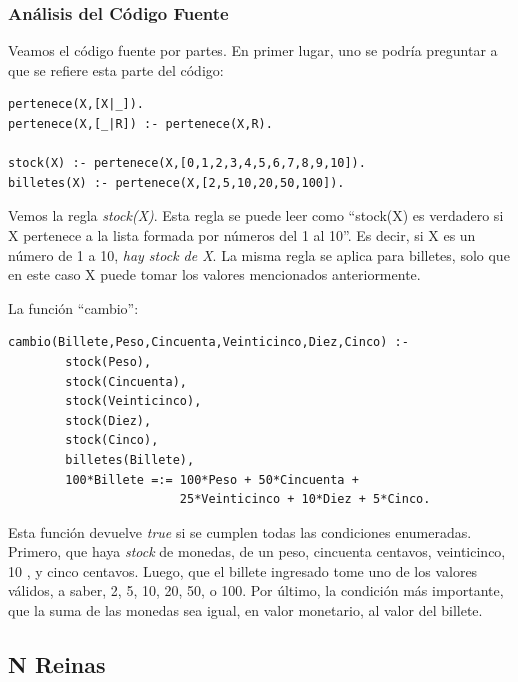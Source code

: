 \documentclass[12pt,titlepage]{article}
\begin{document}
\subsubsection{Análisis del Código Fuente}

Veamos el código fuente por partes. En primer lugar, uno se podría preguntar a que se refiere esta parte del código:
\begin{lstlisting}
pertenece(X,[X|_]).
pertenece(X,[_|R]) :- pertenece(X,R).

stock(X) :- pertenece(X,[0,1,2,3,4,5,6,7,8,9,10]).
billetes(X) :- pertenece(X,[2,5,10,20,50,100]).
\end{lstlisting}

Vemos la regla \textit{stock(X)}. Esta regla se puede leer como ``stock(X) es verdadero si X pertenece a la lista formada por números del 1 al 10''. Es decir, si X es un número de 1 a 10, \textit{hay stock de X}. La misma regla se aplica para billetes, solo que en este caso X puede tomar los valores mencionados anteriormente.

La función ``cambio'':

\begin{lstlisting}
cambio(Billete,Peso,Cincuenta,Veinticinco,Diez,Cinco) :-
        stock(Peso),
        stock(Cincuenta),
        stock(Veinticinco),
        stock(Diez),
        stock(Cinco),
        billetes(Billete),
        100*Billete =:= 100*Peso + 50*Cincuenta + 
                        25*Veinticinco + 10*Diez + 5*Cinco.
\end{lstlisting}

Esta función devuelve \textit{true} si se cumplen todas las condiciones enumeradas. Primero, que haya \textit{stock} de monedas, de un peso, cincuenta centavos, veinticinco, 10 , y cinco centavos. Luego, que el billete ingresado tome uno de los valores válidos, a saber, 2, 5, 10, 20, 50, o 100. Por último, la condición más importante, que la suma de las monedas sea igual, en valor monetario, al valor del billete.

\subsection{N Reinas}
\end{document}
